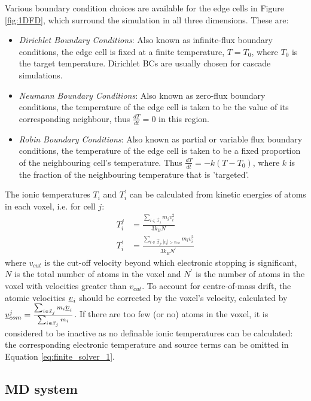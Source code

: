 Various boundary condition choices are available for the edge cells 
in Figure \ref{fig:1DFD}, which surround the simulation in all three 
dimensions. These are:
\begin{itemize}
	\item {\em Dirichlet Boundary Conditions}: Also known as 
	infinite-flux boundary conditions, the edge cell is fixed at a 
	finite temperature, $T = T_0$, where $T_0$ is the target 
	temperature. Dirichlet BCs are usually chosen for cascade 
	simulations.
	
	\item {\em Neumann Boundary Conditions}: Also known as 
	zero-flux boundary conditions, the temperature of the edge 
	cell is taken to be the value of its corresponding neighbour, 
	thus $\frac{dT}{dt} = 0$ in this region.
	
	\item {\em Robin Boundary Conditions}: Also known as 
	partial or variable flux boundary conditions, the temperature 
	of the edge cell is taken to be a fixed proportion of the 
	neighbouring cell's temperature. Thus 
	$\frac{dT}{dt} = -k (T-T_0)$, where $k$ is the fraction of 
	the neighbouring temperature that is 'targeted'.
\end{itemize}

The ionic temperatures $T_i$ and $T_i^{\prime}$ can be calculated 
from kinetic energies of atoms in each voxel, i.e. for cell $j$:
\begin{align}
T_{i}^{j}          &= \frac{\sum_{i \in \vec{x}_j} m_i v_i^2}{3 k_B N} \\
T_{i}^{\prime} &= \frac{\sum_{i \in \vec{x}_j, |v_i | > v_{cut}} m_i v_i^2}{3 k_B N^{\prime}}
\end{align}
where $v_{cut}$ is the cut-off velocity beyond which electronic stopping 
is significant, $N$ is the total number of atoms in the voxel and $N^{\prime}$ 
is the number of atoms in the voxel with velocities greater than $v_{cut}$. 
To account for centre-of-mass drift, the atomic velocities $\mbox{$\underline{v}$}_i$ 
should be corrected by the voxel's velocity, calculated by 
$\mbox{$\underline{v}$}^j_{com} = \frac{\sum_{i \in \vec{x}_j} m_i \mbox{$\underline{v}$}_i}{\sum_{i \in \vec{x}_j} m_i}$.
If there are too few (or no) atoms in the voxel, it is considered to be 
inactive as no definable ionic temperatures can be calculated: the 
corresponding electronic temperature and source terms can be 
omitted in Equation \ref{eq:finite_solver_1}. 

\subsection*{MD system}

